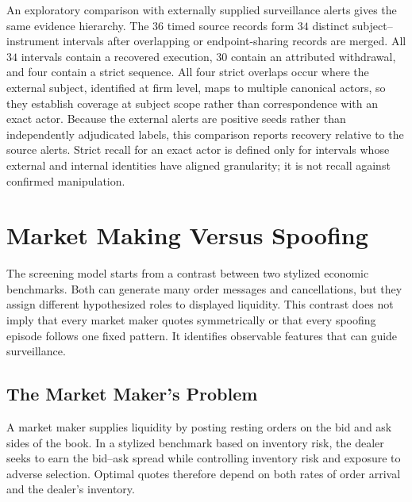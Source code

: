 \documentclass[11pt]{article}
\newenvironment{review}{\begingroup\color{blue}}{\endgroup}
\begin{document}
An exploratory comparison with externally supplied surveillance alerts gives the same evidence hierarchy. The $36$ timed
source records form $34$ distinct subject--instrument intervals after overlapping or endpoint-sharing records are merged. All
$34$ intervals contain a recovered execution, $30$ contain an attributed withdrawal, and four contain a strict
sequence. All four strict overlaps occur where \begin{review}the external subject, identified at firm level, maps to multiple canonical actors\end{review}, so they
establish \begin{review}coverage at subject scope rather than correspondence with an exact actor\end{review}. Because the external alerts are positive seeds
rather than independently adjudicated labels, this comparison reports recovery relative to the source alerts. \begin{review}Strict recall for an exact actor\end{review} is defined only for intervals whose external and internal identities have aligned granularity; it is not recall
against confirmed manipulation.

\section{Market Making Versus Spoofing}
\label{sec:mm_vs_spoofing}
The screening model starts from a contrast between two stylized economic benchmarks. Both can generate many order messages
and cancellations, but they assign different hypothesized roles to displayed liquidity. This contrast does not imply that
every market maker quotes symmetrically or that every spoofing episode follows one fixed pattern. It identifies observable
features that can guide surveillance.

\subsection{The Market Maker's Problem}
\label{subsec:market_maker}
A market maker supplies liquidity by posting resting orders on the bid and ask sides of the book. In \begin{review}a stylized benchmark based on inventory risk\end{review}, the dealer seeks to earn the bid--ask spread while controlling inventory risk and exposure to
adverse selection. Optimal quotes therefore depend on both \begin{review}rates of order arrival\end{review} and the dealer's inventory.
\end{document}
